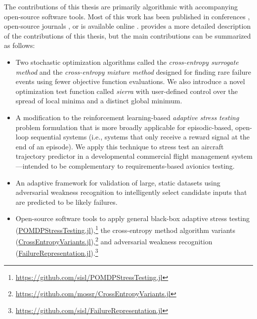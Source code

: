 The contributions of this thesis are primarily algorithmic with accompanying open-source software tools.
Most of this work has been published in conferences \cite{moss2020adaptive}, open-source journals \cite{moss2021pomdpstresstesting}, or is available online \cite{moss2020crossentropy}.
 provides a more detailed description of the contributions of this thesis, but the main contributions can be summarized as follows:

\begin{itemize}
    \item Two stochastic optimization algorithms called the \textit{cross-entropy surrogate method} and the \textit{cross-entropy mixture method} designed for finding rare failure events using fewer objective function evaluations. We also introduce a novel optimization test function called \textit{sierra} with user-defined control over the spread of local minima and a distinct global minimum.

    \item A modification to the reinforcement learning-based \textit{adaptive stress testing} problem formulation that is more broadly applicable for episodic-based, open-loop sequential systems (i.e., systems that only receive a reward signal at the end of an episode). We apply this technique to stress test an aircraft trajectory predictor in a developmental commercial flight management system---intended to be complementary to requirements-based avionics testing.

    \item An adaptive framework for validation of large, static datasets using adversarial weakness recognition to intelligently select candidate inputs that are predicted to be likely failures. 

    \item Open-source software tools to apply general black-box adaptive stress testing (\href{https://github.com/sisl/POMDPStressTesting.jl}{POMDPStressTesting.jl}),\footnote{\url{https://github.com/sisl/POMDPStressTesting.jl}} the cross-entropy method algorithm variants (\href{https://github.com/mossr/CrossEntropyVariants.jl}{CrossEntropyVariants.jl}),\footnote{\url{https://github.com/mossr/CrossEntropyVariants.jl}} and adversarial weakness recognition (\href{https://github.com/sisl/FailureRepresentation.jl}{FailureRepresentation.jl}).\footnote{\url{https://github.com/sisl/FailureRepresentation.jl}}
\end{itemize}

